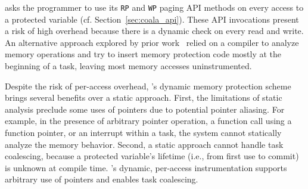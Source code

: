 \sys asks the programmer to use its {\tt RP} and {\tt WP} paging API methods on
every access to a protected variable (cf. Section~\ref{sec:coala_api}).  These
API invocations present a risk of high overhead because there is a dynamic
check on every read and write. An alternative approach explored by prior
work~\cite{alpaca} relied on a compiler to analyze memory operations and try to
insert memory protection code mostly at the beginning of a task, leaving most
memory accesses uninstrumented.  

Despite the risk of per-access overhead, \sys's dynamic memory protection
scheme brings several benefits over a static approach.  First, the limitations
of static analysis preclude some uses of pointers due to potential pointer
aliasing. For example, in the presence of arbitrary pointer operation, a
function call using a function pointer, or an interrupt within a task, the
system cannot statically analyze the memory behavior.   Second, a static approach
cannot handle task coalescing, because a protected variable's lifetime (i.e.,
from first use to commit) is unknown at compile time. \sys's dynamic,
per-access instrumentation supports arbitrary use of pointers and enables task
coalescing.
%


